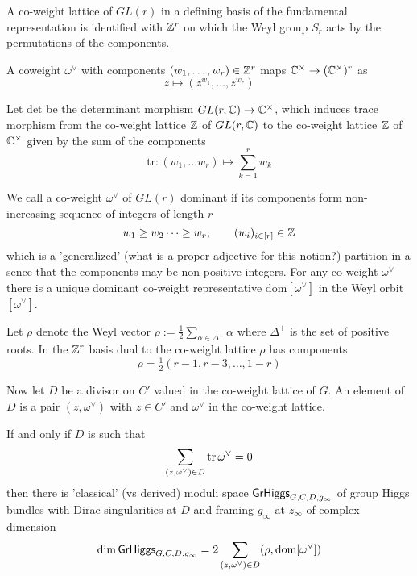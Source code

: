 \documentclass[12pt,psamsfonts,reqno]{amsart}
\begin{document}
\begin{remark}
A co-weight lattice of $GL(r)$ in a defining basis of the fundamental representation
is identified with $\mathbb Z^{r}$ on which the Weyl group $S_r$ acts by the permutations of the components. 


A coweight $\omega^{\vee}$ with components $(w_1, \dots, w_r) \in \mathbb Z^{r}$ maps $\mathbb C^{\times} \to (\mathbb C^{\times})^{r}$ as
\begin{equation}
  z \mapsto (z^{w_1}, \dots, z^{w_r})
\end{equation}

Let $\mathrm{det}$ be the determinant morphism $GL(r,\mathbb C) \to \mathbb C^{\times}$, which induces
trace morphism from the co-weight lattice $\mathbb Z$ of $GL(r,\mathbb C)$ to the co-weight lattice $\mathbb Z$ of $\mathbb C^{\times}$ given by the sum
of the components 
\begin{equation}
\mathrm{tr}:   (w_1, \dots w_r) \mapsto \sum_{k=1}^{r} w_k 
\end{equation}

We call a co-weight $\omega^{\vee}$ of $GL(r)$ dominant if its components form non-increasing sequence of integers of length $r$
\begin{equation}
  w_1 \geq w_2 \dots \geq w_r, \qquad (w_i)_{i \in [r]} \in \mathbb Z
\end{equation}
which is a 'generalized' (what is a proper adjective for this notion?) partition in a sence that the components may be non-positive integers. For any co-weight $\omega^{\vee}$ there is a unique dominant co-weight representative $\mathrm{dom} [\omega^{\vee}]$
in the Weyl orbit $[\omega^{\vee}]$.

Let $\rho$ denote the Weyl vector $\rho := \frac{1}{2} \sum_{\alpha \in \Delta^{+}} \alpha $ where $\Delta^{+}$ is
the set of positive roots. In the $\mathbb Z^{r}$ basis dual to the co-weight lattice $\rho$ has components
\begin{equation}
  \rho = \tfrac{1}{2} ( r - 1, r - 3, \dots, 1-r)
\end{equation}


Now let $D$ be a divisor on $C'$ valued in the co-weight lattice of $G$. An element of $D$ is a pair $(z, \omega^\vee)$
with $z \in C'$ and $\omega^{\vee}$ in the co-weight lattice.
\begin{lemma}
  If and only if $D$ is such that 
  \begin{equation}
    \sum_{(z,\omega^{\vee}) \in D} \operatorname{tr} \omega^{\vee} = 0
  \end{equation}
  then there is 'classical' (vs derived) moduli space $\mathsf{GrHiggs}_{G,C,D,g_\infty}$
  of group Higgs bundles with Dirac singularities at $D$ and framing $g_\infty$ at $z_\infty$ of complex dimension
  \begin{equation}
\label{eq:dim}
    \dim \mathsf{GrHiggs}_{G,C,D,g_\infty} =   2  \sum_{(z,\omega^{\vee}) \in D} ( \rho, \mathrm{dom}[\omega^{\vee}])
  \end{equation}
\end{lemma}



\end{remark}
\end{document}
